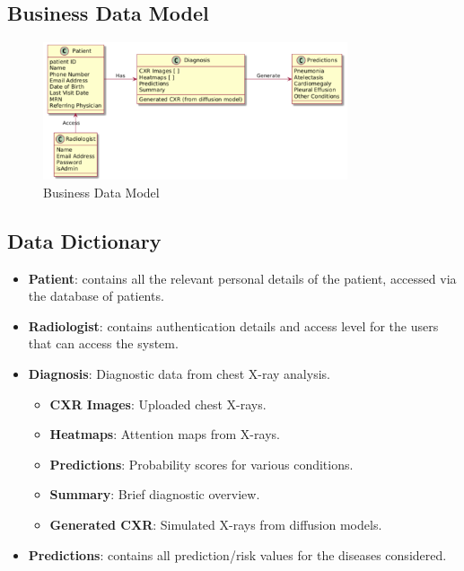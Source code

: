 \documentclass[12pt]{article}
\begin{document}
\subsection{Business Data Model}
\begin{figure}[H]
    \centering
    \includegraphics[width=0.8\textwidth]{images/bussiness_data_model.png}
    \caption{Business Data Model}
    \label{fig:business_data_model}
\end{figure}
\subsection{Data Dictionary}
\begin{itemize}
    \item \textbf{Patient}: contains all the relevant personal details of the patient, accessed via the database of patients.

    \item \textbf{Radiologist}: contains authentication details and access level for the users that can access the system.

    \item \textbf{Diagnosis}: Diagnostic data from chest X-ray analysis.
    \begin{itemize}
        \item \textbf{CXR Images}: Uploaded chest X-rays.
        \item \textbf{Heatmaps}: Attention maps from X-rays.
        \item \textbf{Predictions}: Probability scores for various conditions.
        \item \textbf{Summary}: Brief diagnostic overview.
        \item \textbf{Generated CXR}: Simulated X-rays from diffusion models.
    \end{itemize}

    \item \textbf{Predictions}: contains all prediction/risk values for the diseases considered.
\end{itemize}
\end{document}
